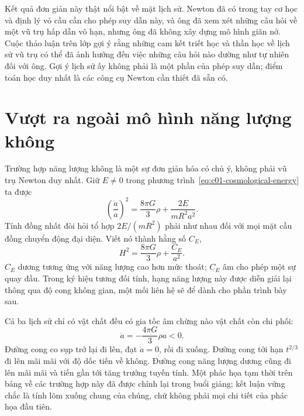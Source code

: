 Kết quả đơn giản này thật nổi bật về mặt lịch sử. Newton đã có trong tay cơ học và định lý vỏ cầu cần cho phép suy dẫn này, và ông đã xem xét những câu hỏi về một vũ trụ hấp dẫn vô hạn, nhưng ông đã không xây dựng mô hình giãn nở. Cuộc thảo luận trên lớp gợi ý rằng những cam kết triết học và thần học về lịch sử vũ trụ có thể đã ảnh hưởng đến việc những câu hỏi nào dường như tự nhiên đối với ông. Gợi ý lịch sử ấy không phải là một phần của phép suy dẫn; điểm toán học duy nhất là các công cụ Newton cần thiết đã sẵn có.

\begin{classroomqa}
\end{classroomqa}

\section{Vượt ra ngoài mô hình năng lượng không}

Trường hợp năng lượng không là một sự đơn giản hóa có chủ ý, không phải vũ trụ Newton duy nhất. Giữ \(E\neq0\) trong phương trình~\eqref{eq:c01-cosmological-energy} ta được
\begin{equation}
\left(\frac{\dot a}{a}\right)^2
=\frac{8\pi G}{3}\rho+\frac{2E}{mR^2a^2}.
\label{eq:c01-nonzero-energy}
\end{equation}
Tính đồng nhất đòi hỏi tổ hợp \(2E/(mR^2)\) phải như nhau đối với mọi mặt cầu đồng chuyển động đại diện. Viết nó thành hằng số \(C_E\),
\begin{equation}
H^2=\frac{8\pi G}{3}\rho+\frac{C_E}{a^2}.
\end{equation}
\(C_E\) dương tương ứng với năng lượng cao hơn mức thoát; \(C_E\) âm cho phép một sự quay đầu. Trong ký hiệu tương đối tính, hạng năng lượng này được diễn giải lại thông qua độ cong không gian, một mối liên hệ sẽ để dành cho phần trình bày sau.

Cả ba lịch sử chỉ có vật chất đều có gia tốc âm chừng nào vật chất còn chi phối:
\begin{equation}
\ddot a=-\frac{4\pi G}{3}\rho a<0.
\end{equation}
Đường cong co sụp trở lại đi lên, đạt \(\dot a=0\), rồi đi xuống. Đường cong tới hạn \(t^{2/3}\) đi lên mãi mãi với độ dốc tiến về không. Đường cong năng lượng dương cũng đi lên mãi mãi và tiến gần tới tăng trưởng tuyến tính. Một phác họa tạm thời trên bảng về các trường hợp này đã được chỉnh lại trong buổi giảng; kết luận vững chắc là tính lõm xuống chung của chúng, chứ không phải mọi chi tiết của phác họa đầu tiên.

